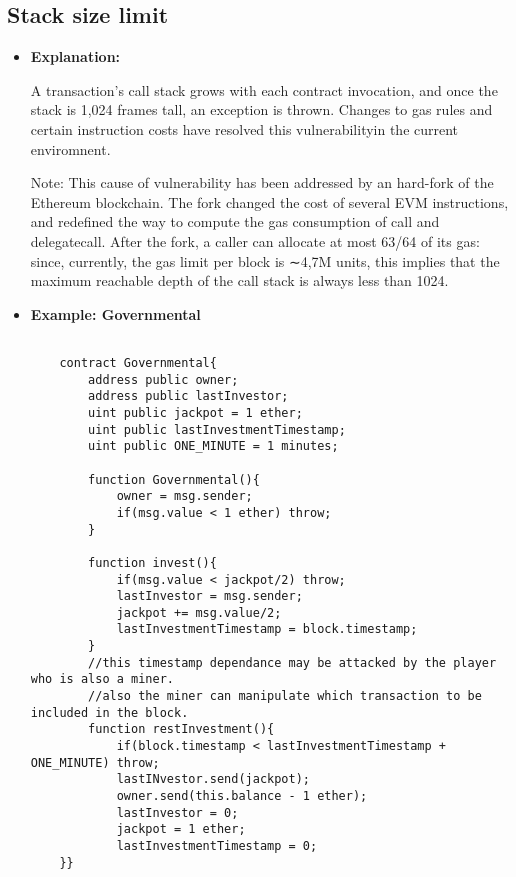 \documentclass{llncs}
\begin{document}
\subsection{Stack size limit}
\begin{itemize}
\item \textbf{Explanation:} 

A transaction’s call stack grows with each contract invocation, and once the stack is 1,024 frames tall, an exception is thrown. Changes to gas rules and certain instruction costs have resolved this vulnerabilityin the current enviromnent.

Note: This cause of vulnerability has been addressed by an hard-fork of the Ethereum blockchain. The fork changed the cost of several EVM instructions, and redefined the way to compute the gas consumption of call and delegatecall. After the fork, a caller can allocate at most 63/64 of its gas: since, currently, the gas limit per block is ∼4,7M units, this implies that the maximum reachable depth of the call stack is always less than 1024.

\item \textbf{Example: Governmental}

	\begin{minipage}{.5\textwidth} 
	{\scriptsize
	\begin{verbatim}
	
	contract Governmental{
	    address public owner;
	    address public lastInvestor;
	    uint public jackpot = 1 ether;
	    uint public lastInvestmentTimestamp;
	    uint public ONE_MINUTE = 1 minutes;
	    
	    function Governmental(){
	        owner = msg.sender;
	        if(msg.value < 1 ether) throw;
	    }
	    
	    function invest(){ 
	        if(msg.value < jackpot/2) throw;
	        lastInvestor = msg.sender;
	        jackpot += msg.value/2;
	        lastInvestmentTimestamp = block.timestamp;
	    }
	    //this timestamp dependance may be attacked by the player who is also a miner.
	    //also the miner can manipulate which transaction to be included in the block.
	    function restInvestment(){
	        if(block.timestamp < lastInvestmentTimestamp + ONE_MINUTE) throw;
	        lastINvestor.send(jackpot);
	        owner.send(this.balance - 1 ether);
	        lastInvestor = 0;
	        jackpot = 1 ether;
	        lastInvestmentTimestamp = 0;
	}}

	\end{verbatim} }
	\end{minipage}	



\end{itemize}
\end{document}
